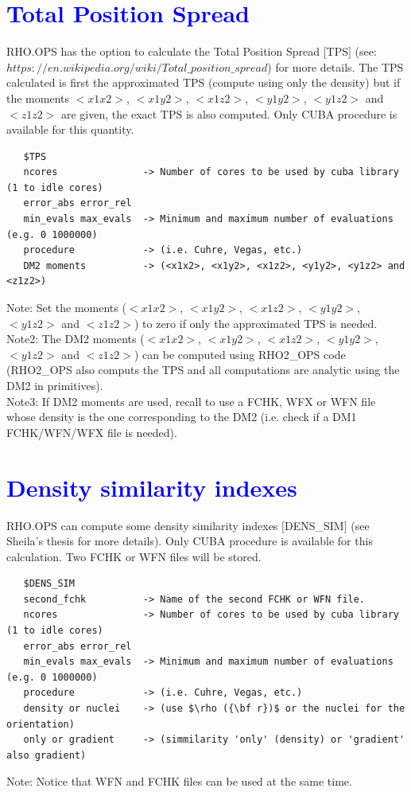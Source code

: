 \documentclass[10pt,a4paper]{article}
\newcommand{\tbl}[1]{{\textcolor{blue}{#1}}}
\begin{document}
{\section{\tbl{\textbf{Total Position Spread}}}
\noindent RHO.OPS has the option to calculate the Total Position Spread $[$TPS$]$ (see: $https://en.wikipedia.org/wiki/Total\_position\_spread$) for more details. The TPS calculated is first the approximated TPS (compute using only the density) but if the moments $<x1x2>$, $<x1y2>$, $<x1z2>$, $<y1y2>$, $<y1z2>$ and $<z1z2>$ are given, the exact TPS is also computed. Only CUBA procedure is available for this quantity. 
\begin{verbatim}
   $TPS
   ncores               -> Number of cores to be used by cuba library (1 to idle cores) 
   error_abs error_rel    
   min_evals max_evals  -> Minimum and maximum number of evaluations (e.g. 0 1000000)
   procedure            -> (i.e. Cuhre, Vegas, etc.)
   DM2 moments          -> (<x1x2>, <x1y2>, <x1z2>, <y1y2>, <y1z2> and <z1z2>)
\end{verbatim}
Note: Set the moments  ($<x1x2>$, $<x1y2>$, $<x1z2>$, $<y1y2>$, $<y1z2>$ and $<z1z2>$) to zero if only the approximated TPS is needed.\\
Note2: The DM2 moments  ($<x1x2>$, $<x1y2>$, $<x1z2>$, $<y1y2>$, $<y1z2>$ and $<z1z2>$) can be computed using RHO2\_OPS code (RHO2\_OPS also computs the TPS and all computations are analytic using the DM2 in primitives). \\
Note3: If DM2 moments  are used, recall to use a FCHK, WFX or WFN file whose density is the one corresponding to the DM2 (i.e. check if a DM1 FCHK/WFN/WFX file is needed).  
\section{\tbl{\textbf{Density similarity indexes}}}
\noindent RHO.OPS can compute some density similarity indexes $[$DENS\_SIM$]$ (see Sheila's thesis for more details). Only CUBA procedure is available for this calculation. Two FCHK or WFN files will be stored. 
\begin{verbatim}
   $DENS_SIM
   second_fchk          -> Name of the second FCHK or WFN file. 
   ncores               -> Number of cores to be used by cuba library (1 to idle cores) 
   error_abs error_rel    
   min_evals max_evals  -> Minimum and maximum number of evaluations (e.g. 0 1000000)
   procedure            -> (i.e. Cuhre, Vegas, etc.)
   density or nuclei    -> (use $\rho ({\bf r})$ or the nuclei for the orientation)
   only or gradient     -> (simmilarity 'only' (density) or 'gradient' also gradient)
\end{verbatim}
Note: Notice that WFN and FCHK files can be used at the same time.\\
}
\end{document}
